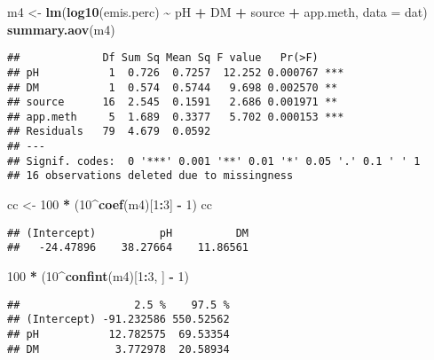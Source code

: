 \documentclass[
]{article}
\newenvironment{Shaded}{\begin{snugshade}}{\end{snugshade}}
\newcommand{\AttributeTok}[1]{\textcolor[rgb]{0.13,0.29,0.53}{#1}}
\newcommand{\DecValTok}[1]{\textcolor[rgb]{0.00,0.00,0.81}{#1}}
\newcommand{\FunctionTok}[1]{\textcolor[rgb]{0.13,0.29,0.53}{\textbf{#1}}}
\newcommand{\NormalTok}[1]{#1}
\newcommand{\OtherTok}[1]{\textcolor[rgb]{0.56,0.35,0.01}{#1}}
\newcommand{\SpecialCharTok}[1]{\textcolor[rgb]{0.81,0.36,0.00}{\textbf{#1}}}
\begin{document}
\begin{Shaded}
\begin{Highlighting}[]
\NormalTok{m4 }\OtherTok{\textless{}{-}} \FunctionTok{lm}\NormalTok{(}\FunctionTok{log10}\NormalTok{(emis.perc) }\SpecialCharTok{\textasciitilde{}}\NormalTok{ pH }\SpecialCharTok{+}\NormalTok{ DM }\SpecialCharTok{+}\NormalTok{ source }\SpecialCharTok{+}\NormalTok{ app.meth, }\AttributeTok{data =}\NormalTok{ dat)}
\FunctionTok{summary.aov}\NormalTok{(m4)}
\end{Highlighting}
\end{Shaded}

\begin{verbatim}
##             Df Sum Sq Mean Sq F value   Pr(>F)    
## pH           1  0.726  0.7257  12.252 0.000767 ***
## DM           1  0.574  0.5744   9.698 0.002570 ** 
## source      16  2.545  0.1591   2.686 0.001971 ** 
## app.meth     5  1.689  0.3377   5.702 0.000153 ***
## Residuals   79  4.679  0.0592                     
## ---
## Signif. codes:  0 '***' 0.001 '**' 0.01 '*' 0.05 '.' 0.1 ' ' 1
## 16 observations deleted due to missingness
\end{verbatim}

\begin{Shaded}
\begin{Highlighting}[]
\NormalTok{cc }\OtherTok{\textless{}{-}} \DecValTok{100} \SpecialCharTok{*}\NormalTok{ (}\DecValTok{10}\SpecialCharTok{\^{}}\FunctionTok{coef}\NormalTok{(m4)[}\DecValTok{1}\SpecialCharTok{:}\DecValTok{3}\NormalTok{] }\SpecialCharTok{{-}} \DecValTok{1}\NormalTok{)}
\NormalTok{cc}
\end{Highlighting}
\end{Shaded}

\begin{verbatim}
## (Intercept)          pH          DM 
##   -24.47896    38.27664    11.86561
\end{verbatim}

\begin{Shaded}
\begin{Highlighting}[]
\DecValTok{100} \SpecialCharTok{*}\NormalTok{ (}\DecValTok{10}\SpecialCharTok{\^{}}\FunctionTok{confint}\NormalTok{(m4)[}\DecValTok{1}\SpecialCharTok{:}\DecValTok{3}\NormalTok{, ] }\SpecialCharTok{{-}} \DecValTok{1}\NormalTok{)}
\end{Highlighting}
\end{Shaded}

\begin{verbatim}
##                  2.5 %    97.5 %
## (Intercept) -91.232586 550.52562
## pH           12.782575  69.53354
## DM            3.772978  20.58934
\end{verbatim}
\end{document}
